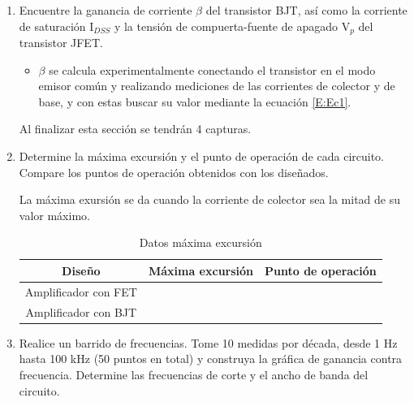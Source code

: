 \documentclass[12pt,letterpaper]{article}     %
\begin{document}
\begin{enumerate}
\item Encuentre la ganancia de corriente $\beta$ del transistor BJT, así como la corriente de saturación I$_{DSS}$ y la tensión de compuerta-fuente de apagado V$_p$ del transistor JFET.

\begin{itemize}
\item $\beta$ se calcula experimentalmente conectando el transistor en el modo emisor común y realizando mediciones de las corrientes de colector y de base, y con estas buscar su valor mediante la ecuación \ref{E:Ec1}.



\end{itemize}

Al finalizar esta sección se tendrán 4 capturas.

\item Determine la máxima excursión y el punto de operación de cada circuito. Compare los puntos de operación obtenidos con los diseñados.

La máxima exursión se da cuando la corriente de colector sea la mitad de su valor máximo.

\begin{table} [!ht]
\caption{Datos máxima excursión}
\label{T:hola}
\begin{center}
\begin{tabular}{| c | c | c |}
\hline
\textbf{Diseño} & \textbf{Máxima excursión} & \textbf{Punto de operación} \\ 
\hline
Amplificador con FET &  &  \\ 
\hline
Amplificador con BJT &  &  \\ 
\hline
\end{tabular}
\end{center}
\end{table}

\item Realice un barrido de frecuencias. Tome 10 medidas por década, desde 1 Hz hasta 100 kHz (50 puntos en total) y construya la 
gráfica de ganancia contra frecuencia. Determine las frecuencias de corte y el ancho de banda del circuito.


\end{enumerate}
\end{document}
